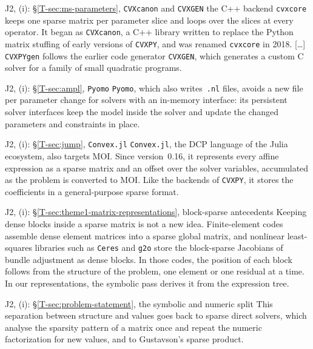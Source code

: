 \documentclass[letterpaper,12pt]{article}
\newcommand{\ac}[1]{#1}
\newcommand{\tsec}[1]{\S\ref{T-#1}}
\begin{document}
\begin{thesisquote}{J2, (i): \tsec{sec:ms-parameters}, \texttt{CVXcanon} and \texttt{CVXGEN}}
the C++ backend \texttt{cvxcore} keeps one sparse matrix per parameter slice and loops over the
slices at every operator. It began as \texttt{CVXcanon}, a C++ library written to replace the
Python matrix stuffing of early versions of \texttt{CVXPY}, and was renamed \texttt{cvxcore} in
2018. [\ldots] \texttt{CVXPYgen} follows the earlier code generator \texttt{CVXGEN}, which
generates a custom C solver for a family of small quadratic programs.
\end{thesisquote}
\begin{thesisquote}{J2, (i): \tsec{sec:ampl}, \texttt{Pyomo}}
\texttt{Pyomo}, which also writes~\texttt{.nl} files, avoids a new file per parameter change
for solvers with an in-memory interface: its persistent solver interfaces keep the model inside
the solver and update the changed parameters and constraints in place.
\end{thesisquote}
\begin{thesisquote}{J2, (i): \tsec{sec:jump}, \texttt{Convex.jl}}
\texttt{Convex.jl}, the \ac{DCP} language of the Julia ecosystem, also targets MOI. Since
version~0.16, it represents every affine expression as a sparse matrix and an offset over the
solver variables, accumulated as the problem is converted to MOI. Like the backends of
\texttt{CVXPY}, it stores the coefficients in a general-purpose sparse format.
\end{thesisquote}
\begin{thesisquote}{J2, (i): \tsec{sec:theme1-matrix-representations}, block-sparse antecedents}
Keeping dense blocks inside a sparse matrix is not a new idea. Finite-element codes assemble
dense element matrices into a sparse global matrix, and nonlinear least-squares libraries such as
\texttt{Ceres} and \texttt{g2o} store the block-sparse Jacobians of bundle adjustment as dense
blocks. In those codes, the position of each block follows from the structure of the problem,
one element or one residual at a time. In our representations, the symbolic pass derives it from
the expression tree.
\end{thesisquote}
\begin{thesisquote}{J2, (i): \tsec{sec:problem-statement}, the symbolic and numeric split}
This separation between structure and values goes back to sparse direct solvers, which analyse
the sparsity pattern of a matrix once and repeat the numeric factorization for new values, and
to Gustavson's sparse product.
\end{thesisquote}
\end{document}
